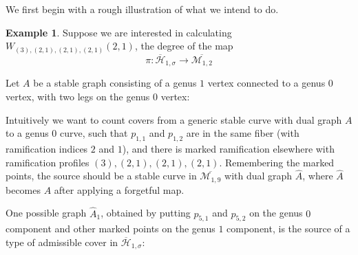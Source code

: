 \documentclass[11pt]{article}           %
\newcommand{\Hb}{\overline{\mathcal H}}
\theoremstyle{definition}
\newtheorem{eg}[thm]{Example}
\begin{document}
We first begin with a rough illustration of what we intend to do.

\begin{eg}
  Suppose we are interested in calculating $W_{(3),(2,1),(2,1),(2,1)}(2,1)$, the degree of the map
  \[
  \pi:\Hb_{1,\sigma}\to\overline{\mathcal M_{1,2}}
  \]
  
  Let $A$ be a stable graph consisting of a genus $1$ vertex connected to a genus $0$ vertex, with two legs on the
  genus $0$ vertex:

  

  Intuitively we want to count covers from a generic stable curve with dual graph $A$ to a genus $0$
  curve, such that $p_{1,1}$ and $p_{1,2}$ are in the same fiber (with ramification indices $2$ and $1$),
  and there is marked ramification elsewhere with ramification profiles $(3),(2,1),(2,1),(2,1)$.
  Remembering the marked points, the source should be a stable curve in $\overline{\mathcal M_{1,9}}$ with dual graph $\hat A$, where $\hat A$
  becomes $A$ after applying a forgetful map.

  One possible graph $\hat A_1$, obtained by putting $p_{5,1}$ and $p_{5,2}$ on the genus $0$ component and other
  marked points on the genus $1$ component, is the source of a type of admissible cover in $\Hb_{1,\sigma}$:

                  \begin{tikzpicture}[thick,amat/.style={matrix of nodes,nodes in empty cells,
  row sep=2.5em,rounded corners,
  nodes={draw,solid,circle,minimum size=1.0cm}},
  dmat/.style={matrix of nodes,nodes in empty cells,row sep=2.5em,nodes={minimum size=1.0cm},draw=myred},
  fsnode/.style={fill=myblue},
  ssnode/.style={fill=mygreen}]


\end{tikzpicture}
\end{eg}
\end{document}
